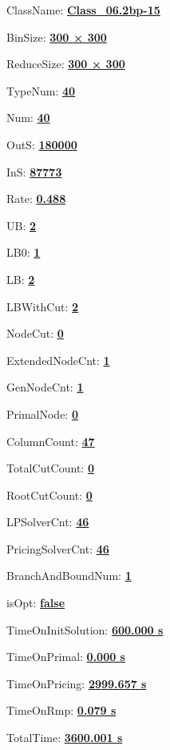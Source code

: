 \documentclass[11pt]{article}
\begin{document}
\pagestyle{empty}


ClassName: \underline{\textbf{Class_06.2bp-15}}
\par
BinSize: \underline{\textbf{300 × 300}}
\par
ReduceSize: \underline{\textbf{300 × 300}}
\par
TypeNum: \underline{\textbf{40}}
\par
Num: \underline{\textbf{40}}
\par
OutS: \underline{\textbf{180000}}
\par
InS: \underline{\textbf{87773}}
\par
Rate: \underline{\textbf{0.488}}
\par
UB: \underline{\textbf{2}}
\par
LB0: \underline{\textbf{1}}
\par
LB: \underline{\textbf{2}}
\par
LBWithCut: \underline{\textbf{2}}
\par
NodeCut: \underline{\textbf{0}}
\par
ExtendedNodeCnt: \underline{\textbf{1}}
\par
GenNodeCnt: \underline{\textbf{1}}
\par
PrimalNode: \underline{\textbf{0}}
\par
ColumnCount: \underline{\textbf{47}}
\par
TotalCutCount: \underline{\textbf{0}}
\par
RootCutCount: \underline{\textbf{0}}
\par
LPSolverCnt: \underline{\textbf{46}}
\par
PricingSolverCnt: \underline{\textbf{46}}
\par
BranchAndBoundNum: \underline{\textbf{1}}
\par
isOpt: \underline{\textbf{false}}
\par
TimeOnInitSolution: \underline{\textbf{600.000 s}}
\par
TimeOnPrimal: \underline{\textbf{0.000 s}}
\par
TimeOnPricing: \underline{\textbf{2999.657 s}}
\par
TimeOnRmp: \underline{\textbf{0.079 s}}
\par
TotalTime: \underline{\textbf{3600.001 s}}
\par
\newpage
\end{document}
